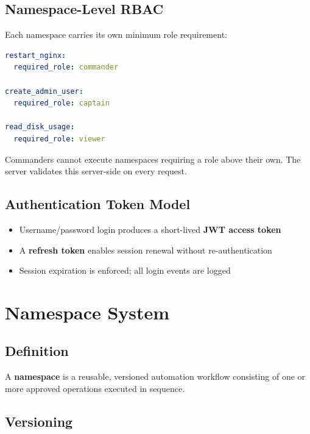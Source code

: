 \documentclass[12pt,a4paper]{article}
\begin{document}
\subsection{Namespace-Level RBAC}

Each namespace carries its own minimum role requirement:

\begin{lstlisting}[language=yaml, caption={Namespace RBAC configuration}]
restart_nginx:
  required_role: commander

create_admin_user:
  required_role: captain

read_disk_usage:
  required_role: viewer
\end{lstlisting}

Commanders cannot execute namespaces requiring a role above their own. The server validates this server-side on every request.

\subsection{Authentication Token Model}

\begin{itemize}[noitemsep]
    \item Username/password login produces a short-lived \textbf{JWT access token}
    \item A \textbf{refresh token} enables session renewal without re-authentication
    \item Session expiration is enforced; all login events are logged
\end{itemize}

\section{Namespace System}

\subsection{Definition}

A \textbf{namespace} is a reusable, versioned automation workflow consisting of one or more approved operations executed in sequence.

\subsection{Versioning}
\end{document}
